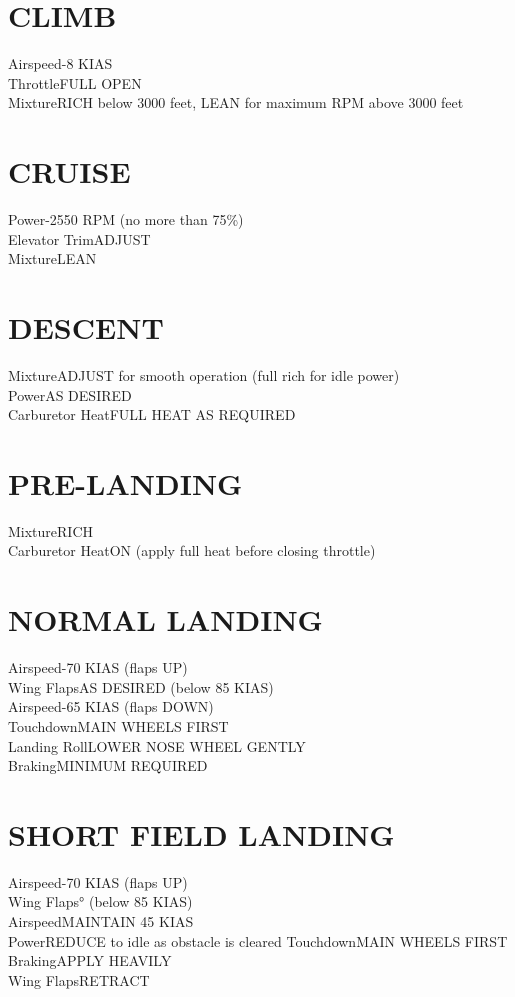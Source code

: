 \documentclass{article}
\begin{document}
\begin{multicols*}{2}
\section*{CLIMB}
Airspeed-8 KIAS\\
Throttle\dotfill FULL OPEN\\
Mixture\dotfill RICH below 3000 feet, LEAN for maximum RPM above 3000 feet\\
\section*{CRUISE}
Power-2550 RPM (no more than 75\%)\\
Elevator Trim\dotfill ADJUST\\
Mixture\dotfill LEAN
\section*{DESCENT}
Mixture\dotfill ADJUST for smooth operation (full rich for idle power)\\
Power\dotfill AS DESIRED\\
Carburetor Heat\dotfill FULL HEAT AS REQUIRED
\section*{PRE-LANDING}
Mixture\dotfill RICH\\
Carburetor Heat\dotfill ON (apply full heat before closing throttle)\\
\section*{NORMAL LANDING}
Airspeed-70 KIAS (flaps UP)\\
Wing Flaps\dotfill AS DESIRED (below 85 KIAS)\\
Airspeed-65 KIAS (flaps DOWN)\\
Touchdown\dotfill MAIN WHEELS FIRST\\
Landing Roll\dotfill LOWER NOSE WHEEL GENTLY\\
Braking\dotfill MINIMUM REQUIRED
\section*{SHORT FIELD LANDING}
Airspeed-70 KIAS (flaps UP)\\
Wing Flaps° (below 85 KIAS)\\
Airspeed\dotfill MAINTAIN 45 KIAS\\
Power\dotfill REDUCE to idle as obstacle is cleared
Touchdown\dotfill MAIN WHEELS FIRST\\
Braking\dotfill APPLY HEAVILY\\
Wing Flaps\dotfill RETRACT

\end{multicols*}
\end{document}
